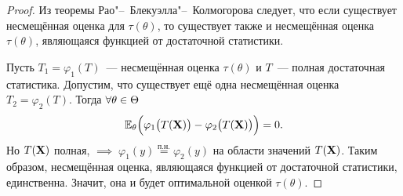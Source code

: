 \begin{proof}
    Из теоремы Рао"--~Блекуэлла"--~Колмогорова следует, что если существует несмещённая оценка для $\tau(\theta)$, 
    то существует также и несмещённая оценка $\tau(\theta)$, являющаяся функцией от достаточной статистики.

    Пусть $T_1 = \varphi_1(T)$~--- несмещённая оценка $\tau(\theta)$ и $T$~--- полная достаточная статистика.
    Допустим, что существует ещё одна несмещённая оценка $T_2 = \varphi_2(T)$.
    Тогда $\forall \theta \in \Theta$
    \begin{equation*}
        \operatorname{\operatorname{\mathbb{E}}_{\theta}} \Bigl(\varphi_1\bigl(T(\mathbf{X})\bigr) - \varphi_2\bigl(T(\mathbf{X})\bigr) \Bigr) = 0.
    \end{equation*}
    Но $T(\mathbf{X})$ полная, $\implies \; \varphi_1(y) \overset{\text{п.н.}}{=} \varphi_2(y)$ на области значений $T(\mathbf{X})$.
    Таким образом, несмещённая оценка, являющаяся функцией от достаточной статистики, единственна.
    Значит, она и будет оптимальной оценкой $\tau(\theta)$. \qedhere
\end{proof}
